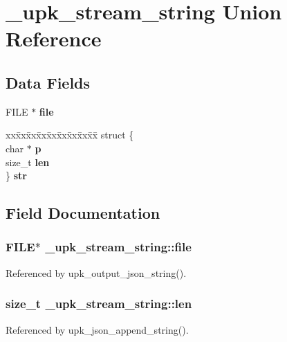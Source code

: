 \section{\_\-upk\_\-stream\_\-string Union Reference}
\label{union__upk__stream__string}
\subsection*{Data Fields}
\begin{DoxyCompactItemize}
\item 
FILE $\ast$ {\bf file}
\item 
\begin{tabbing}
xx\=xx\=xx\=xx\=xx\=xx\=xx\=xx\=xx\=\kill
struct \{\\
\>char $\ast$ {\bf p}\\
\>size\_t {\bf len}\\
\} {\bf str}\\

\end{tabbing}\end{DoxyCompactItemize}


\subsection{Field Documentation}
\subsubsection[{file}]{\setlength{\rightskip}{0pt plus 5cm}FILE$\ast$ {\bf \_\-upk\_\-stream\_\-string::file}}\label{union__upk__stream__string_a7289f52ed23f45e09f48b46c81b3e133}


Referenced by upk\_\-output\_\-json\_\-string().

\subsubsection[{len}]{\setlength{\rightskip}{0pt plus 5cm}size\_\-t {\bf \_\-upk\_\-stream\_\-string::len}}\label{union__upk__stream__string_a908d6a9f33d825669019ba7d761b79da}


Referenced by upk\_\-json\_\-append\_\-string().

